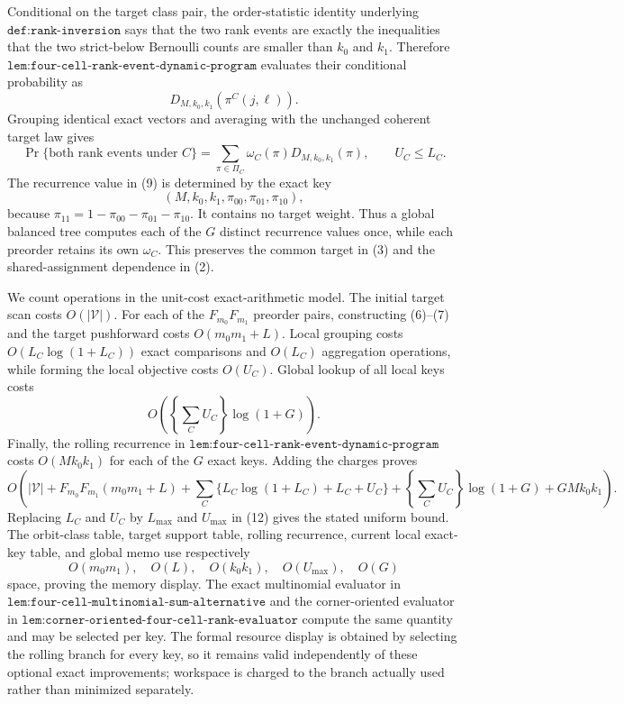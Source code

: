 Conditional on the target class pair, the order-statistic identity underlying \(\texttt{def:rank-inversion}\) says that the two rank events are exactly the inequalities that the two strict-below Bernoulli counts are smaller than \(k_0\) and \(k_1\). Therefore \(\texttt{lem:four-cell-rank-event-dynamic-program}\) evaluates their conditional probability as
\[
D_{M,k_0,k_1}\!\left(\pi^C(j,\ell)\right).
\]
Grouping identical exact vectors and averaging with the unchanged coherent target law gives
\[
\Pr\{\text{both rank events under }C\}
=
\sum_{\pi\in\Pi_C}
\omega_C(\pi)D_{M,k_0,k_1}(\pi),
\qquad
U_C\le L_C.
\tag{9}
\]
The recurrence value in (9) is determined by the exact key
\[
(M,k_0,k_1,\pi_{00},\pi_{01},\pi_{10}),
\tag{10}
\]
because \(\pi_{11}=1-\pi_{00}-\pi_{01}-\pi_{10}\). It contains no target weight. Thus a global balanced tree computes each of the \(G\) distinct recurrence values once, while each preorder retains its own \(\omega_C\). This preserves the common target in (3) and the shared-assignment dependence in (2).

We count operations in the unit-cost exact-arithmetic model. The initial target scan costs \(O(|\mathcal V|)\). For each of the \(F_{m_0}F_{m_1}\) preorder pairs, constructing (6)--(7) and the target pushforward costs \(O(m_0m_1+L)\). Local grouping costs \(O(L_C\log(1+L_C))\) exact comparisons and \(O(L_C)\) aggregation operations, while forming the local objective costs \(O(U_C)\). Global lookup of all local keys costs
\[
O\!\left(\left\{\sum_CU_C\right\}\log(1+G)\right).
\tag{11}
\]
Finally, the rolling recurrence in \(\texttt{lem:four-cell-rank-event-dynamic-program}\) costs \(O(Mk_0k_1)\) for each of the \(G\) exact keys. Adding the charges proves
\[
O\!\left(
|\mathcal V|
+F_{m_0}F_{m_1}(m_0m_1+L)
+\sum_C\{L_C\log(1+L_C)+L_C+U_C\}
+\left\{\sum_CU_C\right\}\log(1+G)
+GMk_0k_1
\right).
\tag{12}
\]
Replacing \(L_C\) and \(U_C\) by \(L_{\max}\) and \(U_{\max}\) in (12) gives the stated uniform bound. The orbit-class table, target support table, rolling recurrence, current local exact-key table, and global memo use respectively
\[
O(m_0m_1),\quad O(L),\quad O(k_0k_1),\quad O(U_{\max}),\quad O(G)
\tag{13}
\]
space, proving the memory display. The exact multinomial evaluator in \(\texttt{lem:four-cell-multinomial-sum-alternative}\) and the corner-oriented evaluator in \(\texttt{lem:corner-oriented-four-cell-rank-evaluator}\) compute the same quantity and may be selected per key. The formal resource display is obtained by selecting the rolling branch for every key, so it remains valid independently of these optional exact improvements; workspace is charged to the branch actually used rather than minimized separately.